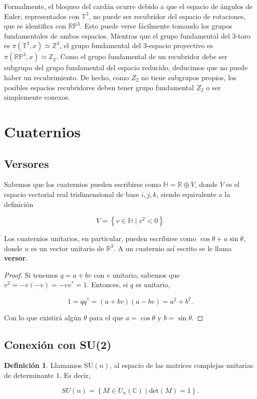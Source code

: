 \documentclass{article}
\theoremstyle{plain}
\theoremstyle{definition}
\newtheorem{definition}{Definición}
\theoremstyle{remark}
\begin{document}
Formalmente, el bloqueo del cardán ocurre debido a que el espacio de
ángulos de Euler, representados con $\mathbb T^3$, no puede ser
recubridor del espacio de rotaciones, que se identifica con
$\mathbb{RP}^3$. Esto puede verse fácilmente tomando los grupos
fundamentales de ambos espacios. Mientras que el grupo fundamental del
3-toro es $\pi(\mathbb T^3, x) \simeq \mathbb Z^3$, el grupo
fundamental del 3-espacio proyectivo es
$\pi(\mathbb{RP}^3, x) \simeq \mathbb Z_2$. Como el grupo fundamental
de un recubridor debe ser subgrupo del grupo fundamental del espacio
reducido, deducimos que no puede haber un recubrimiento. De hecho,
como $Z_2$ no tiene subgrupos propios, los posibles espacios
recubridores deben tener grupo fundamental $Z_2$ o ser simplemente
conexos.

\section{Cuaternios}
\subsection{Versores}
Sabemos que los cuaternios pueden escribirse como
$\mathbb{H} = \mathbb{R} \oplus V$, donde $V$ es el espacio vectorial
real tridimensional de base $i,j,k$, siendo equivalente a la
definición

\[
  V = \left\{ v \in \mathbb{H} \mid v^2 < 0 \right\}
\]

Los cuaternios unitarios, en particular, pueden escribirse como
$\cos \theta + u \sin \theta$, donde $u$ es un vector unitario de
$\mathbb{R}^3$. A un cuaternio así escrito se le llama
\textbf{versor}.

\begin{proof}
  Si tenemos $q = a + bv$ con $v$ unitario, sabemos que $v^2 = - v(-v) = - vv^\ast = 1$.
  Entonces, si $q$ es unitario,

  \[
    1 = qq^\ast = (a+bv)(a-bv) = a^2 + b^2.
  \]

  Con lo que existirá algún $\theta$ para el que $a = \cos \theta$ y $b = \sin \theta$.
\end{proof}

\subsection{Conexión con SU(2)}
\cite{gelfand63}

\begin{definition}
  Llamamos $\mathrm{SU}(n)$, al espacio de las matrices complejas unitarias de determinante $1$.
  Es decir,

  \[SU(n) = \left\{ M \in U_n(\mathbb{C}) \mid \mathrm{det}(M) = 1 \right\}.\]
\end{definition}
\end{document}

